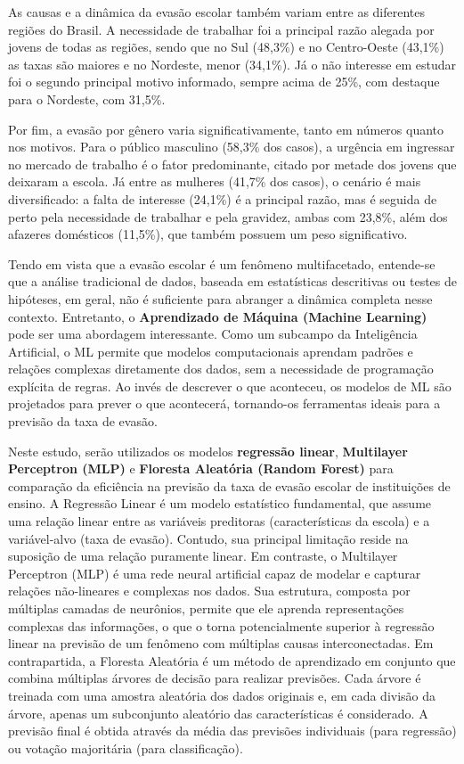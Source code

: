 \documentclass[english, spanish, brazilian]{RBIEarticle} %
\begin{document}
As causas e a dinâmica da evasão escolar também variam entre as diferentes regiões do Brasil. A necessidade de trabalhar foi a principal razão alegada por jovens de todas as regiões, sendo que no Sul (48,3\%) e no Centro-Oeste (43,1\%) as taxas são maiores e no Nordeste, menor (34,1\%). Já o não interesse em estudar foi o segundo principal motivo informado, sempre acima de 25\%, com destaque para o Nordeste, com 31,5\%.

Por fim, a evasão por gênero varia significativamente, tanto em números quanto nos motivos. Para o público masculino (58,3\% dos casos), a urgência em ingressar no mercado de trabalho é o fator predominante, citado por metade dos jovens que deixaram a escola. Já entre as mulheres (41,7\% dos casos), o cenário é mais diversificado: a falta de interesse (24,1\%) é a principal razão, mas é seguida de perto pela necessidade de trabalhar e pela gravidez, ambas com 23,8\%, além dos afazeres domésticos (11,5\%), que também possuem um peso significativo.

Tendo em vista que a evasão escolar é um fenômeno multifacetado, entende-se que a análise tradicional de dados, baseada em estatísticas descritivas ou testes de hipóteses, em geral, não é suficiente para abranger a dinâmica completa nesse contexto. Entretanto, o \textbf{Aprendizado de Máquina (Machine Learning)} pode ser uma abordagem interessante. Como um subcampo da Inteligência Artificial, o ML permite que modelos computacionais aprendam padrões e relações complexas diretamente dos dados, sem a necessidade de programação explícita de regras. Ao invés de descrever o que aconteceu, os modelos de ML são projetados para prever o que acontecerá, tornando-os ferramentas ideais para a previsão da taxa de evasão.

Neste estudo, serão utilizados os modelos \textbf{regressão linear}, \textbf{Multilayer Perceptron (MLP)} e \textbf{Floresta Aleatória (Random Forest)} para comparação da eficiência na previsão da taxa de evasão escolar de instituições de ensino. A Regressão Linear é um modelo estatístico fundamental, que assume uma relação linear entre as variáveis preditoras (características da escola) e a variável-alvo (taxa de evasão). Contudo, sua principal limitação reside na suposição de uma relação puramente linear. Em contraste, o Multilayer Perceptron (MLP) é uma rede neural artificial capaz de modelar e capturar relações não-lineares e complexas nos dados. Sua estrutura, composta por múltiplas camadas de neurônios, permite que ele aprenda representações complexas das informações, o que o torna potencialmente superior à regressão linear na previsão de um fenômeno com múltiplas causas interconectadas. Em contrapartida, a Floresta Aleatória é um método de aprendizado em conjunto que combina múltiplas árvores de decisão para realizar previsões. Cada árvore é treinada com uma amostra aleatória dos dados originais e, em cada divisão da árvore, apenas um subconjunto aleatório das características é considerado. A previsão final é obtida através da média das previsões individuais (para regressão) ou votação majoritária (para classificação).
\end{document}
